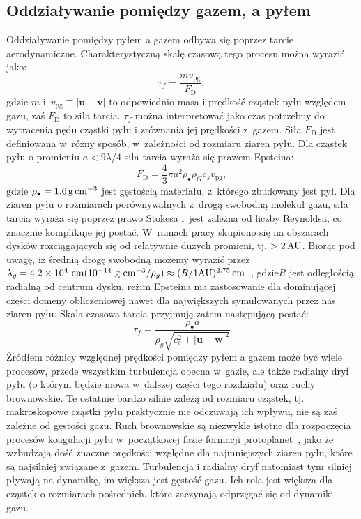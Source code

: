 \subsection{Oddziaływanie pomiędzy gazem, a pyłem}
Oddziaływanie pomiędzy pyłem a gazem odbywa się poprzez tarcie aerodynamiczne.
Charakterystyczną skalę czasową tego procesu można wyrazić jako:
%
\begin{equation}
   \tau_f = \frac{mv_\textrm{pg}}{F_\textrm{D}},
\end{equation}
%
gdzie $m$ i~$v_{\textrm{pg}}\equiv|\mathbf{u} - \mathbf{v}|$ to odpowiednio masa
i prędkość cząstek pyłu względem gazu, zaś $F_\textrm{D}$ to siła tarcia.
$\tau_f$ można interpretować jako czas potrzebny do wytracenia pędu cząstki pyłu
i zrównania jej prędkości z~gazem. Siła $F_\textrm{D}$ jest definiowana w~różny
sposób, w~zależności od rozmiaru ziaren pyłu. Dla cząstek pyłu o promieniu $a < 9
\lambda / 4$ siła tarcia wyraża się prawem Epsteina:
%
\begin{equation}
   F_\textrm{D} = \frac{4}{3}\pi a^2 \rho_\bullet \rho_G c_s v_\textrm{pg}, 
\end{equation}
%
gdzie $\rho_\bullet = 1.6\hbox{$\thinspace\textrm{g}$}\hbox{$\thinspace\textrm{cm}$}^{-3}$ jest gęstością materiału, z~którego
zbudowany jest pył. Dla ziaren pyłu o rozmiarach porównywalnych z~drogą swobodną
molekuł gazu, siła tarcia wyraża się poprzez prawo Stokesa i~jest zależna od
liczby Reynoldsa, co znacznie komplikuje jej postać. W~ramach pracy skupiono się
na obszarach dysków rozciągających się od relatywnie dużych promieni, tj.
$>2\hbox{$\thinspace\textrm{AU}$}$.  Biorąc pod uwagę, iż średnią drogę swobodną możemy wyrazić przez
$\lambda_g = 4.2\times 10^4\textrm{ cm} (10^{-14}\textrm{ g cm}^{-3}/\rho_g)
\approx (R/1 \textrm{AU})^{2.75}\hbox{$\thinspace\textrm{cm}$}$~\citep{W77,BT09}, gdzie$R$ jest odległością
radialną od centrum dysku, reżim Epsteina ma zastosowanie dla dominującej części
domeny obliczeniowej nawet dla największych symulowanych przez nas ziaren pyłu.
Skala czasowa tarcia przyjmuję zatem następującą postać:
%
\begin{equation} 
   \tau_f = \frac{\rho_\bullet a} {\rho_g \sqrt{c_s^2 +
      |\mathbf{u} - \mathbf{w}|^2 }} \label{eq:tauf} 
\end{equation}
%
Źródłem różnicy względnej prędkości pomiędzy pyłem a gazem może być wiele
procesów, przede wszystkim turbulencja obecna w~gazie, ale także radialny dryf
pyłu (o którym będzie mowa w~dalszej części tego rozdziału) oraz ruchy
brownowskie. Te ostatnie bardzo silnie zależą od rozmiaru cząstek, tj.
makroskopowe cząstki pyłu praktycznie nie odczuwają ich wpływu, nie są zaś
zależne od gęstości gazu. Ruch brownowskie są niezwykle istotne dla rozpoczęcia
procesów koagulacji pyłu w~początkowej fazie formacji
protoplanet~\citep{DD05}, jako że wzbudzają dość znaczne prędkości względne
dla najmniejszych ziaren pyłu, które są najsilniej związane z~gazem. Turbulencja
i radialny dryf natomiast tym silniej pływają na dynamikę, im większa jest
gęstość gazu. Ich rola jest większa dla cząstek o rozmiarach pośrednich, które
zaczynają odprzęgać się od dynamiki gazu.

